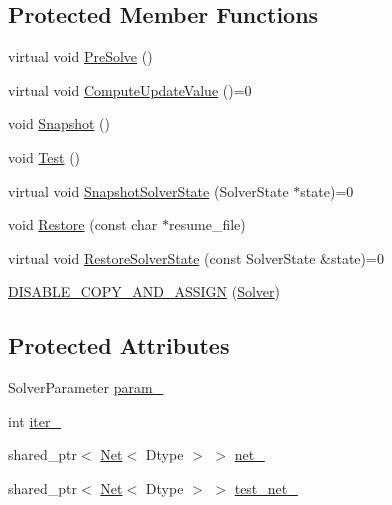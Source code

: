 \subsection*{Protected Member Functions}
\begin{DoxyCompactItemize}
\item 
virtual void \hyperlink{classcaffe_1_1_solver_a11e0ac7956c882960497f0c26140e1eb}{Pre\+Solve} ()
\item 
virtual void \hyperlink{classcaffe_1_1_solver_a383bca772575006d34d05dd735a8abcc}{Compute\+Update\+Value} ()=0
\item 
void \hyperlink{classcaffe_1_1_solver_a54325448a46b2e5d05b8d3c03522c8f7}{Snapshot} ()
\item 
void \hyperlink{classcaffe_1_1_solver_a3d2823aa8f0f82ebbc63572369b756b9}{Test} ()
\item 
virtual void \hyperlink{classcaffe_1_1_solver_a8e5cbfef93c1d7d32aca3db7f270443e}{Snapshot\+Solver\+State} (Solver\+State $\ast$state)=0
\item 
void \hyperlink{classcaffe_1_1_solver_ac133985ef686e874f5bd326350d266d8}{Restore} (const char $\ast$resume\+\_\+file)
\item 
virtual void \hyperlink{classcaffe_1_1_solver_aa0383dd4b216989025cb56266a2b97ac}{Restore\+Solver\+State} (const Solver\+State \&state)=0
\item 
\hyperlink{classcaffe_1_1_solver_a3d7a623b6aa51f7971942d376652924f}{D\+I\+S\+A\+B\+L\+E\+\_\+\+C\+O\+P\+Y\+\_\+\+A\+N\+D\+\_\+\+A\+S\+S\+I\+G\+N} (\hyperlink{classcaffe_1_1_solver}{Solver})
\end{DoxyCompactItemize}
\subsection*{Protected Attributes}
\begin{DoxyCompactItemize}
\item 
Solver\+Parameter \hyperlink{classcaffe_1_1_solver_a718d67175eba4eb6195b19ef38c3f17a}{param\+\_\+}
\item 
int \hyperlink{classcaffe_1_1_solver_ade2a806f82be02b91f3c7c08d234dbbb}{iter\+\_\+}
\item 
shared\+\_\+ptr$<$ \hyperlink{classcaffe_1_1_net}{Net}$<$ Dtype $>$ $>$ \hyperlink{classcaffe_1_1_solver_a93c9e9a8c4d0fd56432b12daf75dea04}{net\+\_\+}
\item 
shared\+\_\+ptr$<$ \hyperlink{classcaffe_1_1_net}{Net}$<$ Dtype $>$ $>$ \hyperlink{classcaffe_1_1_solver_af24f195f59c68f08fcef0526d051e77d}{test\+\_\+net\+\_\+}
\end{DoxyCompactItemize}


